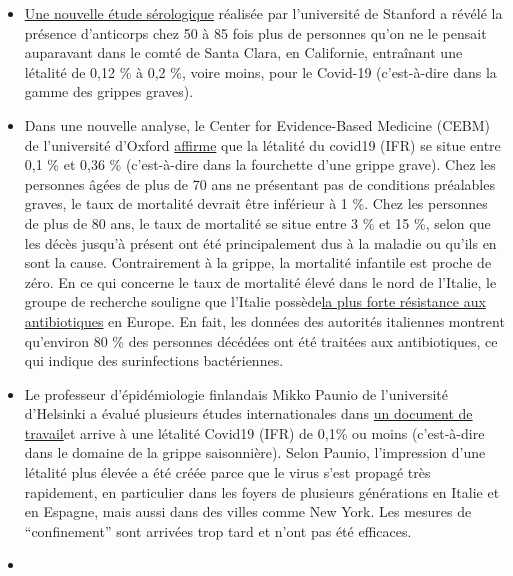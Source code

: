 \begin{itemize}
\tightlist
\item
  \href{https://www.medrxiv.org/content/10.1101/2020.04.14.20062463v1}{Une
  nouvelle étude sérologique} réalisée par l'université de Stanford a
  révélé la présence d'anticorps chez 50 à 85 fois plus de personnes
  qu'on ne le pensait auparavant dans le comté de Santa Clara, en
  Californie, entraînant une létalité de 0,12 \% à 0,2 \%, voire moins,
  pour le Covid-19 (c'est-à-dire dans la gamme des grippes graves).
\item
  Dans une nouvelle analyse, le Center for Evidence-Based Medicine
  (CEBM) de l'université d'Oxford
  \href{https://www.cebm.net/covid-19/global-covid-19-case-fatality-rates/}{affirme}
  que la létalité du covid19 (IFR) se situe entre 0,1 \% et 0,36 \%
  (c'est-à-dire dans la fourchette d'une grippe grave). Chez les
  personnes âgées de plus de 70 ans ne présentant pas de conditions
  préalables graves, le taux de mortalité devrait être inférieur à 1 \%.
  Chez les personnes de plus de 80 ans, le taux de mortalité se situe
  entre 3 \% et 15 \%, selon que les décès jusqu'à présent ont été
  principalement dus à la maladie ou qu'ils en sont la cause.
  Contrairement à la grippe, la mortalité infantile est proche de zéro.
  En ce qui concerne le taux de mortalité élevé dans le nord de
  l'Italie, le groupe de recherche souligne que l'Italie
  possède\href{https://www.ansa.it/english/news/science_tecnology/2019/11/19/italy-top-in-eu-in-antibiotic-resistance_369e0123-0107-445e-8c17-f11932c9d27c.html}{la
  plus forte résistance aux antibiotiques} en Europe. En fait, les
  données des autorités italiennes montrent qu'environ 80 \% des
  personnes décédées ont été traitées aux antibiotiques, ce qui indique
  des surinfections bactériennes.
\item
  Le professeur d'épidémiologie finlandais Mikko Paunio de l'université
  d'Helsinki a évalué plusieurs études internationales dans
  \href{https://lockdownsceptics.org/wp-content/uploads/2020/04/How-the-World-got-Fooled-by-COVID-ed-2c.pdf}{un
  document de travail}et arrive à une létalité Covid19 (IFR) de 0,1\% ou
  moins (c'est-à-dire dans le domaine de la grippe saisonnière). Selon
  Paunio, l'impression d'une létalité plus élevée a été créée parce que
  le virus s'est propagé très rapidement, en particulier dans les foyers
  de plusieurs générations en Italie et en Espagne, mais aussi dans des
  villes comme New York. Les mesures de ``confinement'' sont arrivées
  trop tard et n'ont pas été efficaces.
\item

\end{itemize}
